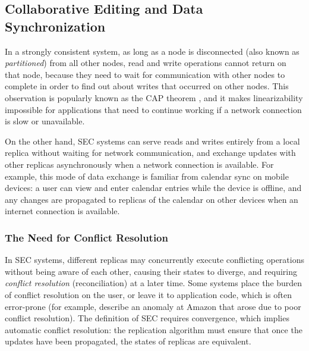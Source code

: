 


\subsection{Collaborative Editing and Data Synchronization}\label{sect.datasync}

In a strongly consistent system, as long as a node is disconnected (also known as
\emph{partitioned}) from all other nodes, read and write operations cannot return on that node,
because they need to wait for communication with other nodes to complete in order to find out about
writes that occurred on other nodes. This observation is popularly known as the CAP theorem
\cite{Gilbert:2002il}, and it makes linearizability impossible for applications that need to
continue working if a network connection is slow or unavailable.

On the other hand, SEC systems can serve reads and writes entirely from a local replica without
waiting for network communication, and exchange updates with other replicas asynchronously when a
network connection is available. For example, this mode of data exchange is familiar from calendar
sync on mobile devices: a user can view and enter calendar entries while the device is offline, and
any changes are propagated to replicas of the calendar on other devices when an internet connection
is available.

\subsubsection{The Need for Conflict Resolution}

In SEC systems, different replicas may concurrently execute conflicting operations without being
aware of each other, causing their states to diverge, and requiring \emph{conflict resolution}
(reconciliation) at a later time. Some systems place the burden of conflict resolution on the user,
or leave it to application code, which is often error-prone (for example, \citet{DeCandia:2007ui}
describe an anomaly at Amazon that arose due to poor conflict resolution). The definition of SEC
requires convergence, which implies automatic conflict resolution: the replication algorithm must
ensure that once the updates have been propagated, the states of replicas are equivalent.

